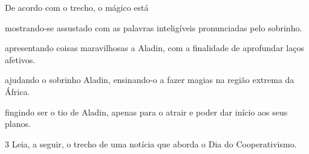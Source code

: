 \begin{myquote}

\end{myquote}

\pagebreak
De acordo com o trecho, o mágico está

\begin{escolha}
\item mostrando-se assustado com as palavras inteligíveis pronunciadas pelo sobrinho.

\item apresentando coisas maravilhosas a Aladin, com a finalidade de aprofundar laços afetivos.

\item ajudando o sobrinho Aladin, ensinando-o a fazer magias na região extrema da África.

\item fingindo ser o tio de Aladin, apenas para o atrair e poder dar início aos seus planos.
\end{escolha}

\num{3} Leia, a seguir, o trecho de uma notícia que aborda o Dia do
Cooperativismo.

